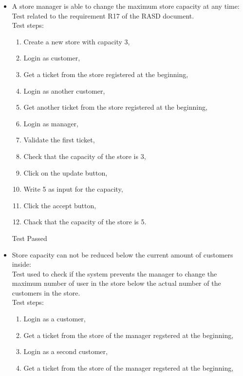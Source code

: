 \begin{itemize}
    \item A store manager is able to change the maximum store capacity at any time: \\
    Test related to the requirement R17 of the RASD document. \\
    Test steps: \\
    \begin{enumerate}
        \item Create a new store with capacity 3,
        \item Login as customer,
        \item Get a ticket from the store registered at the beginning,
        \item Login as another customer,
        \item Get another ticket from the store registered at the beginning,
        \item Login as manager,
        \item Validate the first ticket,
        \item Check that the capacity of the store is 3,
        \item Click on the update button,
        \item Write 5 as input for the capacity,
        \item Click the accept button,
        \item Chack that the capacity of the store is 5.
    \end{enumerate}
    Test Passed \\

    \item Store capacity can not be reduced below the current amount of customers inside: \\
    Test used to check if the system prevents the manager to change the maximum number of user in the store below the actual number of the customers in the store.\\
    Test steps:\\
    \begin{enumerate}
        \item Login as a customer,

        \item Get a ticket from the store of the manager regstered at the beginning,

        \item Login as a second customer,

        \item Get a ticket from the store of the manager regstered at the beginning,


\end{enumerate}
\end{itemize}
